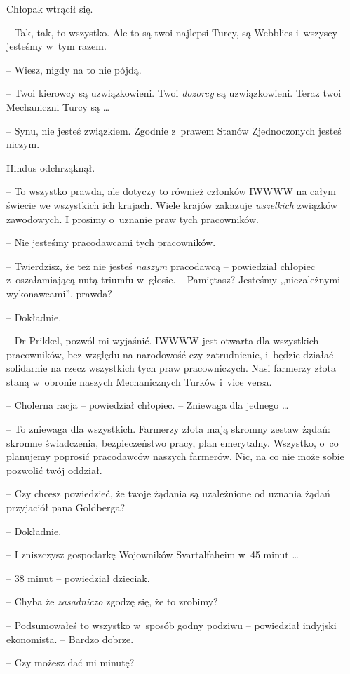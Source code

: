 \documentclass[oneside,polish,11pt,rmheadings]{mwbk}
\begin{document}
Chłopak wtrącił się. 

-- Tak, tak, to wszystko. Ale to są twoi najlepsi Turcy, są Webblies i~wszyscy jesteśmy w~tym razem.

-- Wiesz, nigdy na to nie pójdą.

-- Twoi kierowcy są uzwiązkowieni. Twoi \textit{dozorcy }są uzwiązkowieni. Teraz twoi Mechaniczni Turcy są \ldots 

-- Synu, nie jesteś związkiem. Zgodnie z~prawem Stanów Zjednoczonych jesteś niczym.

Hindus odchrząknął. 

-- To wszystko prawda, ale dotyczy to również członków IWWWW na całym świecie we wszystkich ich krajach. Wiele krajów zakazuje \textit{wszelkich }związków zawodowych. I prosimy o~uznanie praw tych pracowników.

-- Nie jesteśmy pracodawcami tych pracowników.

-- Twierdzisz, że też nie jesteś \textit{naszym }pracodawcą -- powiedział chłopiec z~oszałamiającą nutą triumfu w~głosie. -- Pamiętasz? Jesteśmy ,,niezależnymi wykonawcami'', prawda?

-- Dokładnie. 

-- Dr Prikkel, pozwól mi wyjaśnić. IWWWW jest otwarta dla wszystkich pracowników, bez względu na narodowość czy zatrudnienie, i~będzie działać solidarnie na rzecz wszystkich tych praw pracowniczych. Nasi farmerzy złota staną w~obronie naszych Mechanicznych Turków i~vice versa.

-- Cholerna racja -- powiedział chłopiec. -- Zniewaga dla jednego \ldots 

-- To zniewaga dla wszystkich. Farmerzy złota mają skromny zestaw żądań: skromne świadczenia, bezpieczeństwo pracy, plan emerytalny. Wszystko, o~co planujemy poprosić pracodawców naszych farmerów. Nic, na co nie może sobie pozwolić twój oddział. 

-- Czy chcesz powiedzieć, że twoje żądania są uzależnione od uznania żądań przyjaciół pana Goldberga?

-- Dokładnie. 

-- I zniszczysz gospodarkę Wojowników Svartalfaheim w~45 minut \ldots  

-- 38 minut -- powiedział dzieciak.

-- Chyba że \textit{zasadniczo }zgodzę się, że to zrobimy?

-- Podsumowałeś to wszystko w~sposób godny podziwu -- powiedział indyjski ekonomista. -- Bardzo dobrze. 

-- Czy możesz dać mi minutę?
\end{document}
